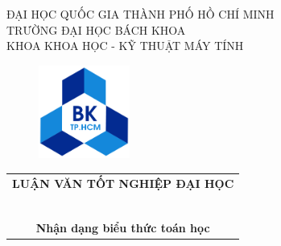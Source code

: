 \documentclass[a4paper,12pt]{article}
\begin{document}
	\begin{titlepage}
		
		\begin{center}
			ĐẠI HỌC QUỐC GIA THÀNH PHỐ HỒ CHÍ MINH \\
			TRƯỜNG ĐẠI HỌC BÁCH KHOA\\
			KHOA KHOA HỌC - KỸ THUẬT MÁY TÍNH\\
			
		\end{center}
		\vspace{1cm}
		
		\begin{figure}[h!]
			\begin{center}
				\includegraphics[width=3cm]{Images/hcmut.png}
			\end{center}
		\end{figure}
		\vspace{1cm}
		
		\begin{center}
			\begin{tabular}{c}
				\multicolumn{1}{c}{\textbf{{LUẬN VĂN TỐT NGHIỆP ĐẠI HỌC}}}\\
				~~\\
				\hline
				\\
				\multicolumn{1}{c}{\textbf{{\Large
							Nhận dạng biểu thức toán học
				}}}\\
				
			\end{tabular}
		\end{center}
		
		\vspace{1cm}
		

\end{titlepage}
\end{document}
